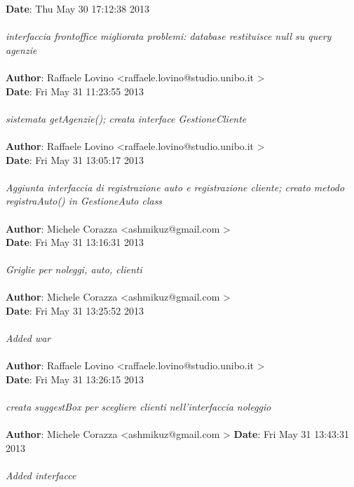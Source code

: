 \documentclass[a4paper,12pt]{article} %
\begin{document}
\textbf{Date}:   Thu May 30 17:12:38 2013 \\
\\
    \emph{interfaccia frontoffice migliorata
    problemi: database restituisce null su query agenzie}\\
\\
\textbf{Author}: Raffaele Lovino \textless raffaele.lovino@studio.unibo.it \textgreater \\
\textbf{Date}:   Fri May 31 11:23:55 2013 \\
\\
    \emph{sistemata getAgenzie();
    creata interface GestioneCliente}\\
\\
\textbf{Author}: Raffaele Lovino \textless raffaele.lovino@studio.unibo.it \textgreater \\
\textbf{Date}:   Fri May 31 13:05:17 2013 \\
\\
    \emph{Aggiunta interfaccia di registrazione auto e registrazione cliente;
    creato metodo registraAuto() in GestioneAuto class}\\
\\
\textbf{Author}: Michele Corazza \textless ashmikuz@gmail.com \textgreater \\
\textbf{Date}:   Fri May 31 13:16:31 2013 \\
\\
    \emph{Griglie per noleggi, auto, clienti}\\
\\
\textbf{Author}: Michele Corazza \textless ashmikuz@gmail.com \textgreater \\
\textbf{Date}:   Fri May 31 13:25:52 2013 \\
\\
    \emph{Added war}\\
\\
\textbf{Author}: Raffaele Lovino \textless raffaele.lovino@studio.unibo.it \textgreater \\
\textbf{Date}:   Fri May 31 13:26:15 2013 \\
\\
    \emph{creata suggestBox per scegliere clienti nell'interfaccia noleggio}\\
\\
\textbf{Author}: Michele Corazza \textless ashmikuz@gmail.com \textgreater
\textbf{Date}:   Fri May 31 13:43:31 2013 \\
\\
    \emph{Added interfacce}\\
\end{document}
